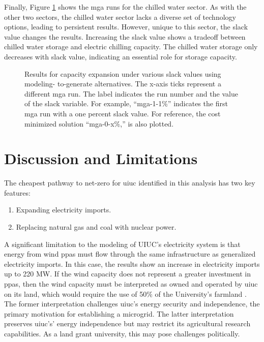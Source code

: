 Finally, Figure \ref{fig:uiuc_chw_mga} shows the \gls{mga} runs for the chilled
water sector. As with the other two sectors, the chilled water sector lacks a
diverse set of technology options, leading to persistent results. However,
unique to this sector, the slack value changes the results. Increasing the slack
value shows a tradeoff between chilled water storage and electric chilling capacity.
The chilled water storage only decreases with slack value, indicating an
essential role for storage capacity.

\begin{figure}[H]
  \centering
  \resizebox{0.95\columnwidth}{!}{}
  \caption{Results for capacity expansion under various slack values using modeling-
  to-generate alternatives. The x-axis ticks represent a different \gls{mga} run.
  The label indicates the run number and the value of the slack variable. For example,
  ``mga-1-1\%'' indicates the first \gls{mga} run with a one percent
  slack value. For reference, the cost minimized solution ``mga-0-x\%,'' is also
  plotted.}
  \label{fig:uiuc_chw_mga}
\end{figure}

\section{Discussion and Limitations}
The cheapest pathway to net-zero for \gls{uiuc} identified in this analysis has two key features:
\begin{enumerate}
\item Expanding electricity imports.
\item Replacing natural gas and coal with nuclear power.
\end{enumerate}
A significant limitation to the modeling of UIUC’s electricity system is that energy
from wind \glspl{ppa} must flow through the same infrastructure as generalized
electricity imports. In this case, the results show an increase in electricity
imports up to 220 MW. If the wind capacity does not represent a greater investment
in \glspl{ppa}, then the wind capacity must be interpreted as owned and operated
by \gls{uiuc} on its land, which would require the use of 50\% of the University's
farmland \cite{lopez_us_2012}. The former interpretation challenges \gls{uiuc}'s
energy security and independence, the primary motivation for establishing a microgrid.
The latter interpretation preserves \gls{uiuc}'s' energy independence but may restrict
its agricultural research capabilities. As a land grant university, this may
pose challenges politically.


